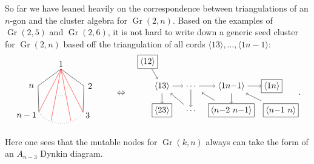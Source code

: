 \documentclass[11pt]{article}
\DeclareMathOperator{\Gr}{Gr}
\def\ket#1{\langle #1 \rangle}
\begin{document}
So far we have leaned heavily on the correspondence between triangulations of an $n$-gon and the cluster algebra for $\Gr(2,n)$. Based on the examples of $\Gr(2,5)$ and $\Gr(2,6)$, it is not hard to write down a generic seed cluster for $\Gr(2,n)$ based off the triangulation of all cords $\ket{13},\ldots,\ket{1n{-}1}$:
\begin{equation}\label{eq:g2n-seed}
\begin{gathered}
\begin{tikzpicture}
	\coordinate (P1) at (90:1);
	\coordinate (P2) at (18:1);
	\coordinate (P3) at (320:1.2);
	\coordinate (P4) at (220:1.2);
	\coordinate (P5) at (162:1);
	\draw (0,1.2) node {1};
	\draw (1,.3) node[anchor=west] {2};
	\draw (.9,-.9) node[anchor=west] {3};
	\draw (-.9,-.9) node[anchor=east] {$n-1$};
	\draw (-1,.3) node[anchor=east] {$n$};
	\draw (P1) -- (P2) -- (P3);
	\draw[dotted] (P3) to[out=240,in=300] (P4);
	\draw (P4) -- (P5) -- (P1);
	\draw[red] (P1) -- (P3);
	\draw[red] (P1) -- (P4);
	\draw[red] (P1) -- (290:1.2);
	\draw[red] (P1) -- (250:1.2);
	\draw[dotted] (.2,0) to[out=240,in=300] (-.2,0);
	\draw (2.5,0) node {$\Leftrightarrow$};
	\begin{scope}[xshift = .2cm, yshift = .3cm]
	\def \xSep {1.2}
	\def \xInit {4}
    \node (13) at (\xInit,0) {$\ket{13}$};
    \node (14) at (\xInit+\xSep,0) {$\ldots$};
    \node (15) at (\xInit+2.4*\xSep,0) {$\ket{1n{-}1}$};
	\node[draw, inner sep=1mm] (12) at (\xInit-.5*\xSep,1) {$\ket{12}$};
    \node[draw, inner sep=1mm] (16) at (\xInit+3.8*\xSep,0) {$\ket{1n}$};
    \node[draw, inner sep=1mm,anchor=west] (56) at (\xInit+3.5*\xSep,-1) {$\ket{n{-}1~n}$};
    \node[draw, inner sep=1mm] (45) at (\xInit+2.4*\xSep,-1) {$\ket{n{-}2~n{-}1}$};
    \node (34) at (\xInit+\xSep,-1) {$\ldots$};
    \node[draw, inner sep=1mm] (23) at (\xInit,-1) {$\ket{23}$};
    \draw[->] (12) -- (13);
    \draw[->] (13) -- (14);
    \draw[->] (14) -- (15);
    \draw[->] (15) -- (16);
    \draw[->] (13) -- (23);
    \draw[->, shorten <= 0.15cm] (34) -- (13);
    \draw[->] (14) -- (34);
    \draw[->, shorten <= 0.25cm, shorten >= 0.25cm] (45) -- (14);
    \draw[->] (15) -- (45);
    \draw[->, shorten <= 0.25cm] (56) -- (15);
    \end{scope}
\end{tikzpicture}
\end{gathered}.
\end{equation}
Here one sees that the mutable nodes for $\Gr(k,n)$ always can take the form of an $A_{n-3}$ Dynkin diagram. 
\end{document}
